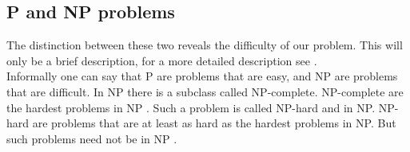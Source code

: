 \subsection{P and NP problems}
The distinction between these two reveals the difficulty of our problem. This will only be a brief description, for a more detailed description see \cite{NP}.\\
Informally one can say that P are problems that are easy, and NP are problems that are difficult. In NP there is a subclass called NP-complete. NP-complete are the hardest problems in NP \cite{adk19}. Such a problem is called NP-hard and in NP. NP-hard are problems that are at least as hard as the hardest problems in NP. But such problems need not be in NP \cite{adk19}.






